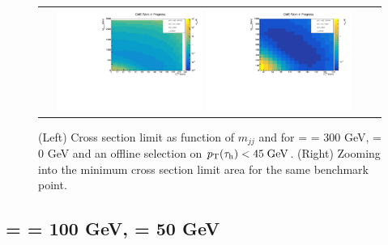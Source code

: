 \begin{figure}[tbh!]
	\centering
	\begin{tabular}{cc}
		\includegraphics[width=0.45\textwidth]{analysis/pics/JetInvMass_vs_MET_xsec_chi300_lsp000_taupt45.pdf}
		\includegraphics[width=0.45\textwidth]{analysis/pics/JetInvMass_vs_MET_xsec_chi300_lsp000_taupt45_zoom.pdf} 		
	\end{tabular}
	\caption{(Left) Cross section limit as function of $m_{jj}$ and \met for \charginopm = \neutralinotwo = 300 GeV, \neutralinoone = 0 GeV and an offline selection on $p_{\text{T}}(\tau_{\text{h}}) <  45\;\text{Ge}\kern-0.06667em\text{V}$. (Right) Zooming into the minimum cross section limit area for the same benchmark point.}
	\label{fig::JetInvMass_vs_MET_xsec_chi300_lsp000_taupt45}
\end{figure}

\FloatBarrier

\subsection*{\charginopm = \neutralinotwo = 100 GeV, \neutralinoone = 50 GeV}

\FloatBarrier

